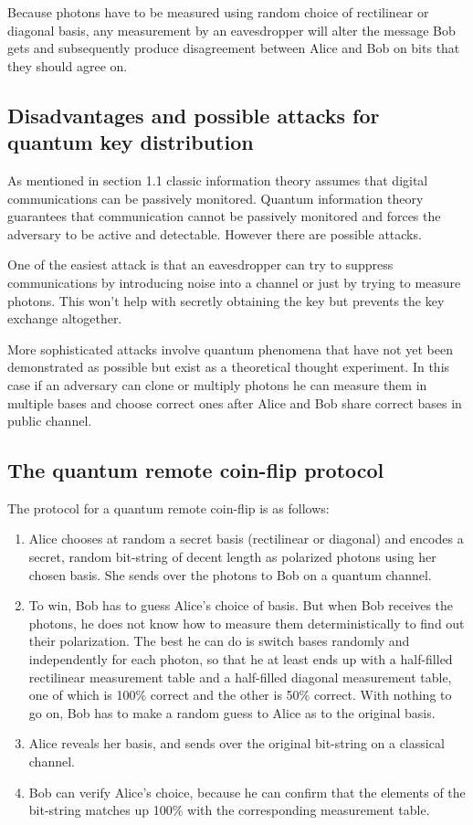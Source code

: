 \documentclass[oneside,a4paper]{article}
\begin{document}
Because photons have to be measured using random choice of rectilinear or diagonal basis, any measurement by an eavesdropper will alter the message Bob gets and subsequently produce disagreement between Alice and Bob on bits that they should agree on.

\subsection{Disadvantages and possible attacks for quantum key distribution}
As mentioned in section 1.1 classic information theory assumes that digital communications can be passively monitored. Quantum information theory guarantees that communication cannot be passively monitored and forces the adversary to be active and detectable. However there are possible attacks.

One of the easiest attack is that an eavesdropper can try to suppress communications by introducing noise into a channel or just by trying to measure photons. This won't help with secretly obtaining the key but prevents the key exchange altogether.

More sophisticated attacks involve quantum phenomena that have not yet been demonstrated as possible but exist as a theoretical thought experiment. In this case if an adversary can clone or multiply photons he can measure them in multiple bases and choose correct ones after Alice and Bob share correct bases in public channel.

\subsection{The quantum remote coin-flip protocol}
The protocol for a quantum remote coin-flip is as follows:
\begin{enumerate}
	\item
		Alice chooses at random a secret basis (rectilinear or diagonal) and encodes a secret, random bit-string of decent length as polarized photons using her chosen basis.
		She sends over the photons to Bob on a quantum channel.
	\item
		To win, Bob has to guess Alice's choice of basis.
		But when Bob receives the photons, he does not know how to measure them deterministically to find out their polarization.
		The best he can do is switch bases randomly and independently for each photon, so that he at least ends up with a half-filled rectilinear measurement table and a half-filled diagonal measurement table, one of which is 100\% correct and the other is 50\% correct.
		With nothing to go on, Bob has to make a random guess to Alice as to the original basis.
	\item Alice reveals her basis, and sends over the original bit-string on a classical channel.
	\item Bob can verify Alice's choice, because he can confirm that the elements of the bit-string matches up 100\% with the corresponding measurement table.
\end{enumerate}
\end{document}
